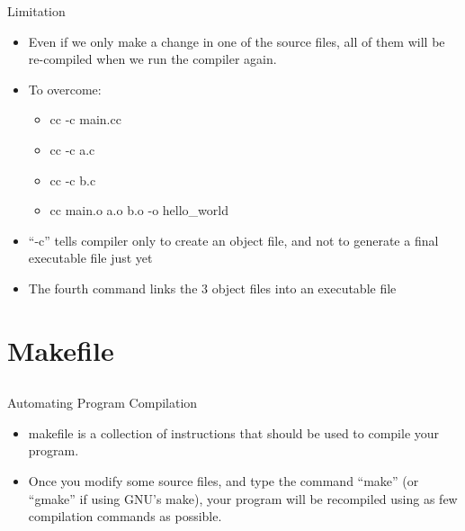\documentclass{beamer}
\begin{document}
\begin{frame}{Limitation}
\begin{itemize}
\item Even if we only make a change in one of the source files, all of them will be re-compiled when we run the compiler again.
\item To overcome:
\begin{itemize}
\item cc -c main.cc 
\item cc -c a.c 
\item cc -c b.c 
\item cc main.o a.o b.o -o hello\_world 
\end{itemize}
\item ``-c'' tells compiler only to create an object file, and not to generate a final executable file just yet
\item The fourth command links the 3 object files into an executable file
\end{itemize}
\end{frame}

\section{Makefile}
\subsection{}

\begin{frame}{Automating Program Compilation}
\begin{itemize}
\item makefile is a collection of instructions that should be used to compile your program.
\item Once you modify some source files, and type the command ``make'' (or ``gmake'' if using GNU's make), your program will be recompiled using as few compilation commands as possible.
\end{itemize}
\end{frame}
\end{document}
